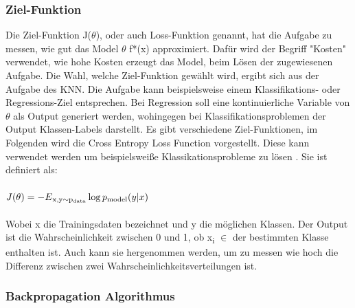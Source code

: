 \documentclass{llncs}
\begin{document}
\newpage
\subsubsection{Ziel-Funktion}\label{sec:Zielfunktion}

Die Ziel-Funktion J($\theta$), oder auch Loss-Funktion genannt, hat die Aufgabe zu messen, wie gut das Model $\theta$ f*(x) approximiert. Dafür wird der Begriff "Kosten" verwendet, wie hohe Kosten erzeugt das Model, beim Lösen der zugewiesenen Aufgabe. Die Wahl, welche Ziel-Funktion gewählt wird, ergibt sich aus der Aufgabe des KNN. Die Aufgabe kann beispielsweise einem Klassifikations- oder Regressions-Ziel entsprechen. Bei Regression soll eine kontinuierliche Variable von $\theta$ als Output generiert werden, wohingegen bei Klassifikationsproblemen der Output Klassen-Labels darstellt. Es gibt verschiedene Ziel-Funktionen, im Folgenden wird die Cross Entropy Loss Function vorgestellt. Diese kann verwendet werden um beispielsweiße Klassikationsprobleme zu lösen \cite{Grundlagen}. Sie ist definiert als:
\\\\
\begin{math}
J(\theta) =-E\textsubscript{x,y$\sim$p\textsubscript{data}}\log p\textsubscript{model}(y|x)
\end{math}
\\\\
Wobei x die Trainingsdaten bezeichnet und y die möglichen Klassen. Der Output ist die Wahrscheinlichkeit zwischen 0 und 1, ob  x\textsubscript{i} $\in$ der bestimmten Klasse enthalten ist. Auch kann sie hergenommen werden, um zu messen wie hoch die Differenz zwischen zwei Wahrscheinlichkeitsverteilungen ist.
\subsubsection{Backpropagation Algorithmus}\label{sec:test}
\end{document}
